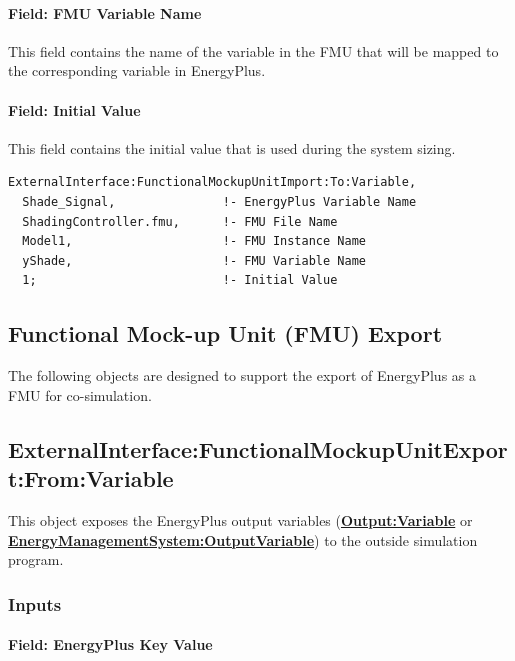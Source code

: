 \paragraph{Field: FMU Variable Name}\label{field-fmu-variable-name-3}

This field contains the name of the variable in the FMU that will be mapped to the corresponding variable in EnergyPlus.

\paragraph{Field: Initial Value}\label{field-initial-value-5}

This field contains the initial value that is used during the system sizing.

\begin{lstlisting}
ExternalInterface:FunctionalMockupUnitImport:To:Variable,
  Shade_Signal,               !- EnergyPlus Variable Name
  ShadingController.fmu,      !- FMU File Name
  Model1,                     !- FMU Instance Name
  yShade,                     !- FMU Variable Name
  1;                          !- Initial Value
\end{lstlisting}

\subsection{Functional Mock-up Unit (FMU) Export}\label{functional-mock-up-unit-fmu-export}

The following objects are designed to support the export of EnergyPlus as a FMU for co-simulation.

\subsection{ExternalInterface:FunctionalMockupUnitExport:From:Variable}\label{externalinterfacefunctionalmockupunitexportfromvariable}

This object exposes the EnergyPlus output variables (\textbf{\hyperref[outputvariable]{Output:Variable}} or \textbf{\hyperref[energymanagementsystemoutputvariable]{EnergyManagementSystem:OutputVariable}}) to the outside simulation program.

\subsubsection{Inputs}\label{inputs-9-006}

\paragraph{Field: EnergyPlus Key Value}\label{field-energyplus-key-value-1}

